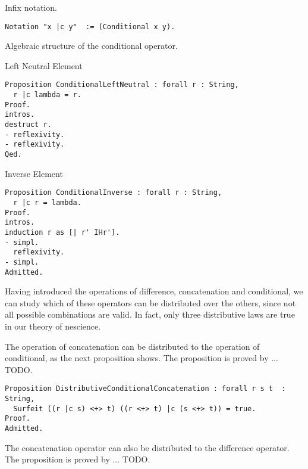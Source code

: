 {\color{red} Infix notation.}

\begin{sourcecode}
{\scriptsize \begin{verbatim}
Notation "x |c y"  := (Conditional x y).
\end{verbatim}}
\end{sourcecode}

{\color{red} Algebraic structure of the conditional operator.}

{\color{red} Left Neutral Element}

\begin{sourcecode}
{\scriptsize \begin{verbatim}
Proposition ConditionalLeftNeutral : forall r : String,
  r |c lambda = r.
Proof.
intros.
destruct r.
- reflexivity.
- reflexivity.
Qed.
\end{verbatim}}
\end{sourcecode}

{\color{red} Inverse Element}

\begin{sourcecode}
{\scriptsize \begin{verbatim}
Proposition ConditionalInverse : forall r : String,
  r |c r = lambda.
Proof.
intros.
induction r as [| r' IHr'].
- simpl.
  reflexivity.
- simpl.
Admitted.
\end{verbatim}}
\end{sourcecode}

Having introduced the operations of difference, concatenation and conditional, we can study which of these operators can be distributed over the others, since not all possible combinations are valid. In fact, only three distributive laws are true in our theory of nescience.

The operation of concatenation can be distributed to the operation of conditional, as the next proposition shows. The proposition is proved by ... {\color{red} TODO}.

\begin{sourcecode}
{\scriptsize \begin{verbatim}
Proposition DistributiveConditionalConcatenation : forall r s t  : String,
  Surfeit ((r |c s) <+> t) ((r <+> t) |c (s <+> t)) = true.
Proof.
Admitted.
\end{verbatim}}
\end{sourcecode}

The concatenation operator can also be distributed to the difference operator. The proposition is proved by ... {\color{red} TODO}.

